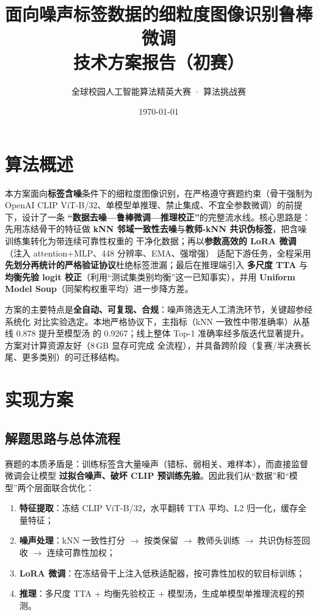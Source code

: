 \documentclass[11pt]{ctexart}
\title{\bfseries 面向噪声标签数据的细粒度图像识别鲁棒微调\\[2pt]\large 技术方案报告（初赛）}
\author{全球校园人工智能算法精英大赛 · 算法挑战赛}
\date{\today}
\newcommand{\kw}[1]{\textbf{#1}}
\begin{document}
\maketitle

\section{算法概述}
本方案面向\kw{标签含噪}条件下的细粒度图像识别，在严格遵守赛题约束（骨干强制为 OpenAI
CLIP ViT-B/32、单模型单推理、禁止集成、不宜全参数微调）的前提下，设计了一条
\kw{“数据去噪—鲁棒微调—推理校正”}的完整流水线。核心思路是：先用冻结骨干的特征做
\kw{kNN 邻域一致性去噪}与\kw{教师-kNN 共识伪标签}，把含噪训练集转化为带连续可靠性权重的
干净化数据；再以\kw{参数高效的 LoRA 微调}（注入 attention+MLP、448 分辨率、EMA、强增强）
适配下游任务，全程采用\kw{先划分再统计的严格验证协议}杜绝标签泄漏；最后在推理端引入
\kw{多尺度 TTA} 与\kw{均衡先验 logit 校正}（利用“测试集类别均衡”这一已知事实），并用
\kw{Uniform Model Soup}（同架构权重平均）进一步降方差。

方案的主要特点是\kw{全自动、可复现、合规}：噪声筛选无人工清洗环节，关键超参经系统化
对比实验选定。本地严格协议下，主指标（kNN 一致性中带准确率）从基线 0.878 提升至模型汤
的 0.9267；线上整体 Top-1 准确率经多版迭代显著提升。方案对计算资源友好（8\,GB 显存可完成
全流程），并具备跨阶段（复赛/半决赛长尾、更多类别）的可迁移结构。

\section{实现方案}

\subsection{解题思路与总体流程}
赛题的本质矛盾是：训练标签含大量噪声（错标、弱相关、难样本），而直接监督微调会让模型
\kw{过拟合噪声、破坏 CLIP 预训练先验}。因此我们从“数据”和“模型”两个层面联合优化：
\begin{enumerate}[leftmargin=2em,itemsep=2pt]
  \item \kw{特征提取}：冻结 CLIP ViT-B/32，水平翻转 TTA 平均、L2 归一化，缓存全量特征；
  \item \kw{噪声处理}：kNN 一致性打分 $\to$ 按类保留 $\to$ 教师头训练 $\to$ 共识伪标签回收 $\to$ 连续可靠性加权；
  \item \kw{LoRA 微调}：在冻结骨干上注入低秩适配器，按可靠性加权的软目标训练；
  \item \kw{推理}：多尺度 TTA + 均衡先验校正 + 模型汤，生成单模型单推理流程的预测。
\end{enumerate}
\end{document}
